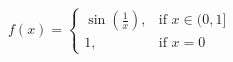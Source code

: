 \documentclass[preview]{standalone}
\begin{document}
\begin{align*}
f(x) = \begin{cases} \sin(\frac{1}{x}), & \text{if } x \in (0, 1] \\ 1, & \text{if } x = 0 \end{cases}
\end{align*}
\end{document}
